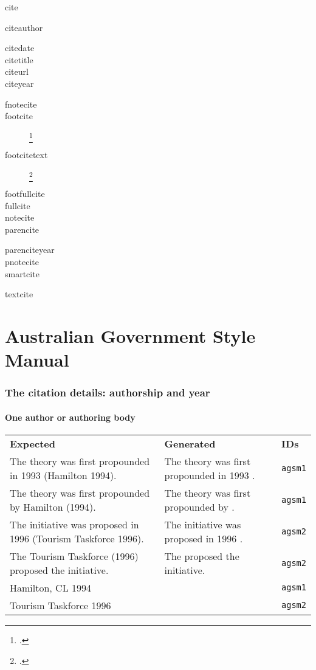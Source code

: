 \documentclass[a4paper,landscape,12pt]{article}
\newlength\q
\newlength\qr
\newenvironment{citetable}
  {\noindent\begin{longtable}{p{\q} p{\q} p{\qr}}\textbf{Expected} & \textbf{Generated} & \textbf{IDs}\\}
  {\end{longtable}}
\begin{document}
\begin{description}
	\item[cite] \cite{agsm}
	\item[citeauthor] \citeauthor{agsm}
	\item[citedate] 
	\item[citetitle] 
	\item[citeurl] 
	\item[citeyear] \citeyear{agsm}
	\item[fnotecite] 
	\item[footcite] \footcite{agsm}
	\item[footcitetext] \footcitetext{agsm}
	\item[footfullcite] 
	\item[fullcite] 
	\item[notecite] 
	\item[parencite] \parencite{agsm}
	\item[parenciteyear] 
	\item[pnotecite] 
	\item[smartcite] \smartcite{agsm}
	\item[textcite] \textcite{agsm}
\end{description}

\onecolumn

\clearpage
\part{Australian Government Style Manual}
\newrefsection

\section{The citation details: authorship and year}

\subsection{One author or authoring body}

\begin{citetable}
	The theory was first propounded in 1993 (Hamilton 1994). & The theory was first propounded in 1993 \parencite{agsm1}. & \texttt{agsm1} \\
	The theory was first propounded by Hamilton (1994). & The theory was first propounded by \textcite{agsm1}. & \texttt{agsm1} \\
	The initiative was proposed in 1996 (Tourism Taskforce 1996). & The initiative was proposed in 1996 \parencite{agsm2}. & \texttt{agsm2} \\
	The Tourism Taskforce (1996) proposed the initiative. & The \textcite{agsm2} proposed the initiative. & \texttt{agsm2} \\
	Hamilton, CL 1994 & \fullcite{agsm1} & \texttt{agsm1} \\
	Tourism Taskforce 1996 & \fullcite{agsm2} & \texttt{agsm2} \\
\end{citetable}
\end{document}
